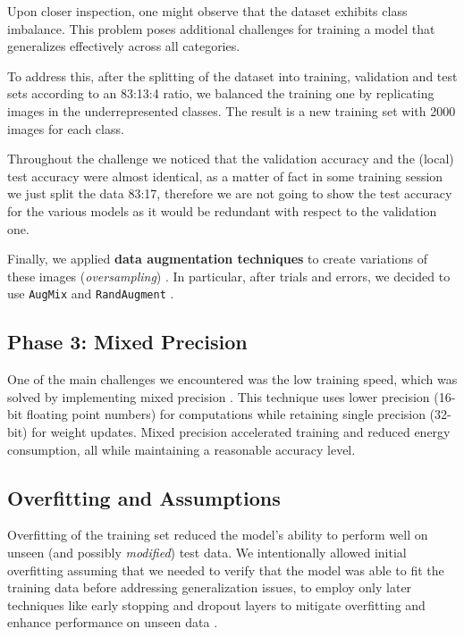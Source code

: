\documentclass[11pt]{article}
\begin{document}
\begin{multicols*}{2}
        \noindent Upon closer inspection, one might observe that the dataset exhibits class imbalance. This problem poses additional challenges for training a model that generalizes effectively across all categories.

        To address this, after the splitting of the dataset into training, validation and test sets according to an 83:13:4 ratio, we balanced the training one by replicating images in the underrepresented classes. The result is a new training set with 2000 images for each class.

        Throughout the challenge we noticed that the validation accuracy and the (local) test accuracy were almost identical, as a matter of fact in some training session we just split the data 83:17, therefore we are not going to show the test accuracy for the various models as it would be redundant with respect to the validation one.

        Finally, we applied \textbf{data augmentation techniques} to create variations of these images (\textit{oversampling}) \cite{oversampling}. In particular, after trials and errors, we decided to use \texttt{AugMix} and \texttt{RandAugment} \cite{aug}.

        \subsection{Phase 3: Mixed Precision}

        One of the main challenges we encountered was the low training speed, which was solved by implementing mixed precision \cite{mixed-precision}. This technique uses lower precision (16-bit floating point numbers) for computations while retaining single precision (32-bit) for weight updates. Mixed precision accelerated training and reduced energy consumption, all while maintaining a reasonable accuracy level. 

        \subsection{Overfitting and Assumptions}
        
        Overfitting of the training set reduced the model's ability to perform well on unseen (and possibly \textit{modified}) test data. We intentionally allowed initial overfitting assuming that we needed to verify that the model was able to fit the training data before addressing generalization issues, to employ only later techniques like early stopping and dropout layers to mitigate overfitting and enhance performance on unseen data \cite{overfitting}.


\end{multicols*}
\end{document}

